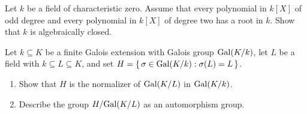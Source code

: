 \begin{problem}
  Let \(k\) be a field of characteristic zero. Assume that every polynomial
  in \(k[X]\) of odd degree and every polynomial in \(k[X]\) of degree two
  has a root in \(k\). Show that \(k\) is algebraically closed.
\end{problem}
\begin{solution}
\end{solution}

\begin{problem}
  Let \(k\subseteq K\) be a finite Galois extension with Galois group
  \(\operatorname{Gal}(K/k)\), let \(L\) be a field with \( k\subseteq L\subseteq K\),
  and set \(H=\left\{\,\sigma\in\operatorname{Gal}(K/k):\sigma(L)=L\,\right\}\).
  \begin{enumerate}[label=(\alph*)]
  \item Show that \(H\) is the normalizer of \(\operatorname{Gal}(K/L)\) in
    \(\operatorname{Gal}(K/k)\).
  \item Describe the group \(H/{\operatorname{Gal}(K/L)}\) as an automorphism group.
  \end{enumerate}
\end{problem}
\begin{solution}
\end{solution}

